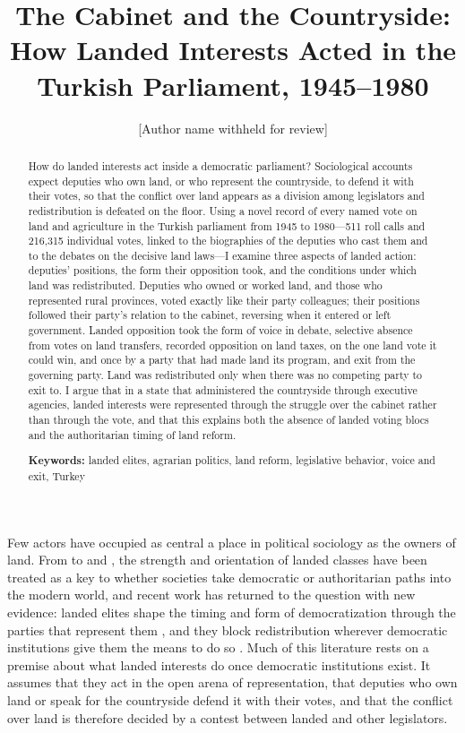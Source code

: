 \documentclass[12pt]{article}
\title{\textbf{The Cabinet and the Countryside:\\ How Landed Interests Acted in the Turkish Parliament, 1945--1980}}
\author{[Author name withheld for review]}
\date{}
\begin{document}
\maketitle
\thispagestyle{empty}

\begin{abstract}
\noindent How do landed interests act inside a democratic parliament? Sociological accounts expect deputies who own land, or who represent the countryside, to defend it with their votes, so that the conflict over land appears as a division among legislators and redistribution is defeated on the floor. Using a novel record of every named vote on land and agriculture in the Turkish parliament from 1945 to 1980---511 roll calls and 216,315 individual votes, linked to the biographies of the deputies who cast them and to the debates on the decisive land laws---I examine three aspects of landed action: deputies' positions, the form their opposition took, and the conditions under which land was redistributed. Deputies who owned or worked land, and those who represented rural provinces, voted exactly like their party colleagues; their positions followed their party's relation to the cabinet, reversing when it entered or left government. Landed opposition took the form of voice in debate, selective absence from votes on land transfers, recorded opposition on land taxes, on the one land vote it could win, and once by a party that had made land its program, and exit from the governing party. Land was redistributed only when there was no competing party to exit to. I argue that in a state that administered the countryside through executive agencies, landed interests were represented through the struggle over the cabinet rather than through the vote, and that this explains both the absence of landed voting blocs and the authoritarian timing of land reform.

\medskip
\noindent\textbf{Keywords:} landed elites, agrarian politics, land reform, legislative behavior, voice and exit, Turkey
\end{abstract}

\newpage
\doublespacing
\setcounter{page}{1}

Few actors have occupied as central a place in political sociology as the owners of land. From \citet{moore1966} to \citet{paige1975} and \citet{skocpol1979}, the strength and orientation of landed classes have been treated as a key to whether societies take democratic or authoritarian paths into the modern world, and recent work has returned to the question with new evidence: landed elites shape the timing and form of democratization through the parties that represent them \citep{ziblatt2017}, and they block redistribution wherever democratic institutions give them the means to do so \citep{albertus2015}. Much of this literature rests on a premise about what landed interests do once democratic institutions exist. It assumes that they act in the open arena of representation, that deputies who own land or speak for the countryside defend it with their votes, and that the conflict over land is therefore decided by a contest between landed and other legislators.
\end{document}
